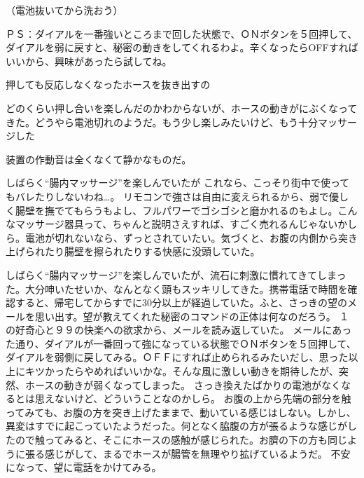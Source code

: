 （電池抜いてから洗おう）

ＰＳ：ダイアルを一番強いところまで回した状態で、ＯＮボタンを５回押して、ダイアルを弱に戻すと、秘密の動きをしてくれるわよ。辛くなったらOFFすればいいから、興味があったら試してね。

押しても反応しなくなったホースを抜き出すの

どのくらい押し合いを楽しんだのかわからないが、ホースの動きがにぶくなってきた。どうやら電池切れのようだ。もう少し楽しみたいけど、もう十分マッサージした


装置の作動音は全くなくて静かなものだ。

しばらく“腸内マッサージ”を楽しんでいたが
これなら、こっそり街中で使ってもバレたりしないわね…。
リモコンで強さは自由に変えられるから、弱で優しく腸壁を撫でてもらうもよし、フルパワーでゴシゴシと磨かれるのもよし。こんなマッサージ器具って、ちゃんと説明さえすれば、すごく売れるんじゃないかしら。電池が切れないなら、ずっとされていたい。気づくと、お腹の内側から突き上げられたり腸壁を擦られたりする快感に没頭していた。

しばらく“腸内マッサージ”を楽しんでいたが、流石に刺激に慣れてきてしまった。大分呻いたせいか、なんとなく頭もスッキリしてきた。携帯電話で時間を確認すると、帰宅してからすでに30分以上が経過していた。ふと、さっきの望のメールを思い出す。望が教えてくれた秘密のコマンドの正体は何なのだろう。
１の好奇心と９９の快楽への欲求から、メールを読み返していた。
メールにあった通り、ダイアルが一番回って強になっている状態でＯＮボタンを５回押して、ダイアルを弱側に戻してみる。ＯＦＦにすれば止められるみたいだし、思った以上にキツかったらやめればいいかな。そんな風に激しい動きを期待したが、突然、ホースの動きが弱くなってしまった。
さっき換えたばかりの電池がなくなるとは思えないけど、どういうことなのかしら。
お腹の上から先端の部分を触ってみても、お腹の方を突き上げたままで、動いている感じはしない。しかし、異変はすでに起こっていたようだった。何となく脇腹の方が張るような感じがしたので触ってみると、そこにホースの感触が感じられた。お臍の下の方も同じように張る感じがして、まるでホースが腸管を無理やり拡げているようだ。
不安になって、望に電話をかけてみる。

